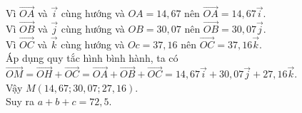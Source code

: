 \begin{bt}
{		Vì $\overrightarrow{OA}$ và $\overrightarrow i$ cùng hướng và $OA=14{,}67$ nên $\overrightarrow{OA}=14{,}67\overrightarrow i$.\\
		Vì $\overrightarrow{OB}$ và $\overrightarrow j$ cùng hướng và $OB=30{,}07$ nên $\overrightarrow{OB}=30{,}07\overrightarrow j$.\\
		Vì $\overrightarrow{OC}$ và $\overrightarrow k$ cùng hướng và $Oc=37{,}16$ nên $\overrightarrow{OC}=37{,}16\overrightarrow k$.\\
		Áp dụng quy tắc hình bình hành, ta có\\
		$\overrightarrow{OM}=\overrightarrow{OH}+\overrightarrow{OC}=\overrightarrow{OA}+\overrightarrow{OB}+\overrightarrow{OC}=14{,}67\overrightarrow i+30{,}07\overrightarrow j+27{,}16\overrightarrow k$.\\
		Vậy $M(14{,}67;30{,}07;27{,}16)$.\\
		Suy ra $a+b+c=72{,}5$.
	}
\end{bt}

